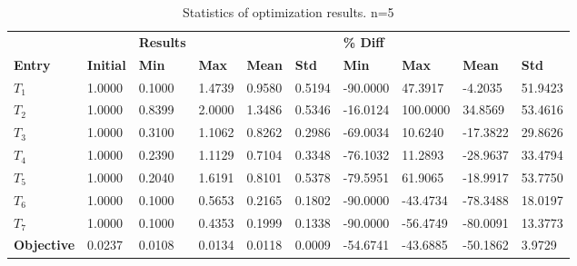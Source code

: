 \begin{table}[H]
\centering
\begin{tabular}{llllllllll}
\textbf{} & \textbf{} & \cellcolor[HTML]{EFEFEF}\textbf{Results} & \cellcolor[HTML]{EFEFEF} & \cellcolor[HTML]{EFEFEF} & \cellcolor[HTML]{EFEFEF} & \cellcolor[HTML]{EFEFEF}\textbf{\% Diff} & \cellcolor[HTML]{EFEFEF} & \cellcolor[HTML]{EFEFEF} & \cellcolor[HTML]{EFEFEF} \\
\rowcolor[HTML]{EFEFEF} 
\textbf{Entry} & \textbf{Initial} & \textbf{Min} & \textbf{Max} & \textbf{Mean} & \textbf{Std} & \textbf{Min} & \textbf{Max} & \textbf{Mean} & \textbf{Std} \\
$T_1$ & 1.0000 & 0.1000 & 1.4739 & 0.9580 & 0.5194 & -90.0000 & 47.3917 & -4.2035 & 51.9423 \\ 
$T_2$ & 1.0000 & 0.8399 & 2.0000 & 1.3486 & 0.5346 & -16.0124 & 100.0000 & 34.8569 & 53.4616 \\ 
$T_3$ & 1.0000 & 0.3100 & 1.1062 & 0.8262 & 0.2986 & -69.0034 & 10.6240 & -17.3822 & 29.8626 \\ 
$T_4$ & 1.0000 & 0.2390 & 1.1129 & 0.7104 & 0.3348 & -76.1032 & 11.2893 & -28.9637 & 33.4794 \\ 
$T_5$ & 1.0000 & 0.2040 & 1.6191 & 0.8101 & 0.5378 & -79.5951 & 61.9065 & -18.9917 & 53.7750 \\ 
$T_6$ & 1.0000 & 0.1000 & 0.5653 & 0.2165 & 0.1802 & -90.0000 & -43.4734 & -78.3488 & 18.0197 \\ 
$T_7$ & 1.0000 & 0.1000 & 0.4353 & 0.1999 & 0.1338 & -90.0000 & -56.4749 & -80.0091 & 13.3773 \\ 
\rowcolor[HTML]{EFEFEF} 
\textbf{Objective} & 0.0237 & 0.0108 & 0.0134 & 0.0118 & 0.0009 & -54.6741 & -43.6885 & -50.1862 & 3.9729 \\ 
\end{tabular}
\caption{Statistics of optimization results. n=5}
\label{tab:StatisticsOptimizationAnalysis}
\end{table}